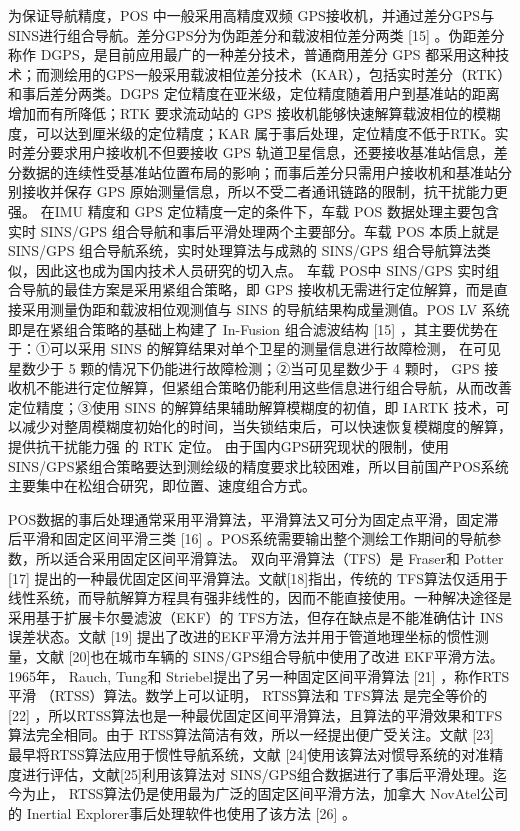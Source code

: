 为保证导航精度，POS 中一般采用高精度双频 GPS接收机，并通过差分GPS与SINS进行组合导航。差分GPS分为伪距差分和载波相位差分两类 [15] 。伪距差分称作 DGPS，是目前应用最广的一种差分技术，普通商用差分 GPS 都采用这种技术；而测绘用的GPS一般采用载波相位差分技术（KAR），包括实时差分（RTK）和事后差分两类。DGPS 定位精度在亚米级，定位精度随着用户到基准站的距离增加而有所降低；RTK 要求流动站的 GPS 接收机能够快速解算载波相位的模糊度，可以达到厘米级的定位精度；KAR 属于事后处理，定位精度不低于RTK。实时差分要求用户接收机不但要接收 GPS 轨道卫星信息，还要接收基准站信息，差分数据的连续性受基准站位置布局的影响；而事后差分只需用户接收机和基准站分别接收并保存 GPS 原始测量信息，所以不受二者通讯链路的限制，抗干扰能力更强。
在IMU 精度和 GPS 定位精度一定的条件下，车载 POS 数据处理主要包含实时 SINS/GPS 组合导航和事后平滑处理两个主要部分。车载 POS 本质上就是 SINS/GPS 组合导航系统，实时处理算法与成熟的 SINS/GPS 组合导航算法类似，因此这也成为国内技术人员研究的切入点。
车载 POS中 SINS/GPS 实时组合导航的最佳方案是采用紧组合策略，即 GPS 接收机无需进行定位解算，而是直接采用测量伪距和载波相位观测值与 SINS 的导航结果构成量测值。POS LV 系统即是在紧组合策略的基础上构建了 In-Fusion 组合滤波结构 [15] ，其主要优势在于：①可以采用 SINS 的解算结果对单个卫星的测量信息进行故障检测， 在可见星数少于 5 颗的情况下仍能进行故障检测；②当可见星数少于 4 颗时， GPS 接收机不能进行定位解算，但紧组合策略仍能利用这些信息进行组合导航，从而改善定位精度；③使用 SINS 的解算结果辅助解算模糊度的初值，即 IARTK 技术，可以减少对整周模糊度初始化的时间，当失锁结束后，可以快速恢复模糊度的解算，提供抗干扰能力强 的 RTK 定位。
由于国内GPS研究现状的限制，使用 SINS/GPS紧组合策略要达到测绘级的精度要求比较困难，所以目前国产POS系统主要集中在松组合研究，即位置、速度组合方式。

POS数据的事后处理通常采用平滑算法，平滑算法又可分为固定点平滑，固定滞后平滑和固定区间平滑三类 [16] 。POS系统需要输出整个测绘工作期间的导航参数，所以适合采用固定区间平滑算法。
双向平滑算法（TFS）是 Fraser和 Potter [17] 提出的一种最优固定区间平滑算法。文献[18]指出，传统的 TFS算法仅适用于线性系统，而导航解算方程具有强非线性的，因而不能直接使用。一种解决途径是采用基于扩展卡尔曼滤波（EKF）的 TFS方法，但存在缺点是不能准确估计 INS误差状态。文献 [19] 提出了改进的EKF平滑方法并用于管道地理坐标的惯性测量，文献 [20]也在城市车辆的 SINS/GPS组合导航中使用了改进 EKF平滑方法。
1965年， Rauch, Tung和 Striebel提出了另一种固定区间平滑算法 [21] ，称作RTS平滑 （RTSS）算法。数学上可以证明， RTSS算法和 TFS算法 是完全等价的 [22] ，所以RTSS算法也是一种最优固定区间平滑算法，且算法的平滑效果和TFS算法完全相同。由于 RTSS算法简洁有效，所以一经提出便广受关注。文献 [23] 最早将RTSS算法应用于惯性导航系统，文献 [24]使用该算法对惯导系统的对准精度进行评估，文献[25]利用该算法对 SINS/GPS组合数据进行了事后平滑处理。迄今为止， RTSS算法仍是使用最为广泛的固定区间平滑方法，加拿大 NovAtel公司的 Inertial Explorer事后处理软件也使用了该方法 [26] 。

